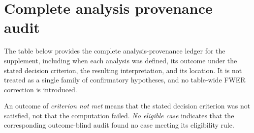 
\section{Complete analysis provenance audit}
\label{sec:app-registry}

The table below provides the complete analysis-provenance ledger for the
supplement, including when each analysis was defined, its outcome under the
stated decision criterion, the resulting interpretation, and its location.
It is not treated as a single family of confirmatory hypotheses, and no
table-wide FWER correction is introduced.

An outcome of \emph{criterion not met} means that the stated decision
criterion was not satisfied, not that the computation failed.
\emph{No eligible case} indicates that the corresponding outcome-blind audit
found no case meeting its eligibility rule.

